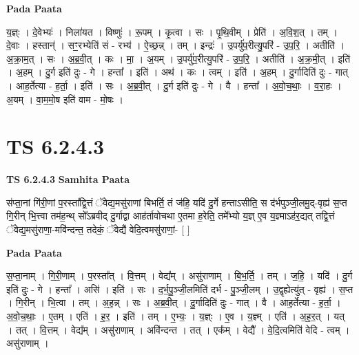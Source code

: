 \documentclass[17pt]{extarticle}
\begin{document}
\textbf{Pada Paata} \newline

य॒ज्ञ्ः । दे॒वेभ्यः॑ । निला॑यत । विष्णुः॑ । रू॒पम् । कृ॒त्वा । सः । पृ॒थि॒वीम् । प्रेति॑ । अ॒वि॒श॒त् । तम् । दे॒वाः । हस्तान्॑ । सꣳ॒॒रभ्येति॑ सं - रभ्य॑ । ऐ॒च्छ॒न्न् । तम् । इन्द्रः॑ । उ॒पर्यु॑प॒रीत्यु॒परि॑ - उ॒प॒रि॒ । अतीति॑ । अ॒क्रा॒म॒त् । सः । अ॒ब्र॒वी॒त् । कः । मा॒ । अ॒यम् । उ॒पर्यु॑प॒रीत्यु॒परि॑ - उ॒प॒रि॒ । अतीति॑ । अ॒क्र॒मी॒त् । इति॑ । अ॒हम् । दु॒र्ग इति॑ दुः - गे । हन्ता᳚ । इति॑ । अथ॑ । कः । त्वम् । इति॑ । अ॒हम् । दु॒र्गादिति॑ दुः - गात् । आह॒र्तेत्या - ह॒र्ता॒ । इति॑ । सः । अ॒ब्र॒वी॒त् । दु॒र्ग इति॑ दुः - गे । वै । हन्ता᳚ । अ॒वो॒च॒थाः॒ । व॒रा॒हः । अ॒यम् । वा॒म॒मो॒ष इति॑ वाम - मो॒षः ।  \newline





\section{ TS 6.2.4.3 }

\textbf{TS 6.2.4.3 } \newline
\textbf{Samhita Paata} \newline

स॑प्ता॒नां गि॑री॒णां प॒रस्ता᳚द्वि॒त्तं ॅवेद्य॒मसु॑राणां बिभर्ति॒ तं ज॑हि॒ यदि॑ दु॒र्गे हन्ताऽसीति॒ स द॑र्भपुञ्जी॒लमु॒द्-वृह्य॑ स॒प्त गि॒रीन् भि॒त्त्वा तम॑ह॒न्थ् सो᳚ऽब्रवीद् दु॒र्गाद्वा आह॑र्तावोचथा ए॒तमा ह॒रेति॒ तमे᳚भ्यो य॒ज्ञ् ए॒व य॒ज्ञ्माऽह॑र॒द्यत् तद्वि॒त्तं ॅवेद्य॒मसु॑राणा॒-मवि॑न्दन्त॒ तदेकं॒ ॅवेद्यै॑ वेदि॒त्वमसु॑राणां॒- [  ] \newline

\textbf{Pada Paata} \newline

स॒प्ता॒नाम् । गि॒री॒णाम् । प॒रस्ता᳚त् । वि॒त्तम् । वेद्य᳚म् । असु॑राणाम् । बि॒भ॒र्ति॒ । तम् । ज॒हि॒ । यदि॑ । दु॒र्ग इति॑ दुः - गे । हन्ता᳚ । असि॑ । इति॑ । सः । द॒र्भ॒पु॒ञ्जी॒लमिति॑ दर्भ - पु॒ञ्जी॒लम् । उ॒द्वृह्येत्यु॑त् - वृह्य॑ । स॒प्त । गि॒रीन् । भि॒त्वा । तम् । अ॒ह॒न्न् । सः । अ॒ब्र॒वी॒त् । दु॒र्गादिति॑ दुः - गात् । वै । आह॒र्तेत्या - ह॒र्ता॒ । अ॒वो॒च॒थाः॒ । ए॒तम् । एति॑ । ह॒र॒ । इति॑ । तम् । ए॒भ्यः॒ । य॒ज्ञ्ः । ए॒व । य॒ज्ञ्म् । एति॑ । अ॒ह॒र॒त् । यत् । तत् । वि॒त्तम् । वेद्य᳚म् । असु॑राणाम् । अवि॑न्दन्त । तत् । एक᳚म् । वेद्यै᳚ । वे॒दि॒त्वमिति॑ वेदि - त्वम् । असु॑राणाम् ।  \newline
\end{document}
